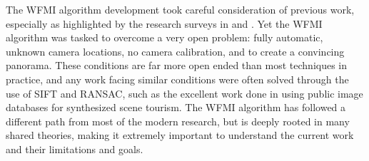    The WFMI algorithm development took careful consideration of previous work, especially as highlighted by the research surveys in \cite{Zitova2003} and \cite{Pluim2003}. Yet the WFMI algorithm was tasked to overcome a very open problem: fully automatic, unknown camera locations, no camera calibration, and to create a convincing panorama. These conditions are far more open ended than most techniques in practice, and any work facing similar conditions were often solved through the use of SIFT and RANSAC, such as the excellent work done in \cite{Snavely2008} using public image databases for synthesized scene tourism. The WFMI algorithm has followed a different path from most of the modern research, but is deeply rooted in many shared theories, making it extremely important to understand the current work and their limitations and goals.
 
 



